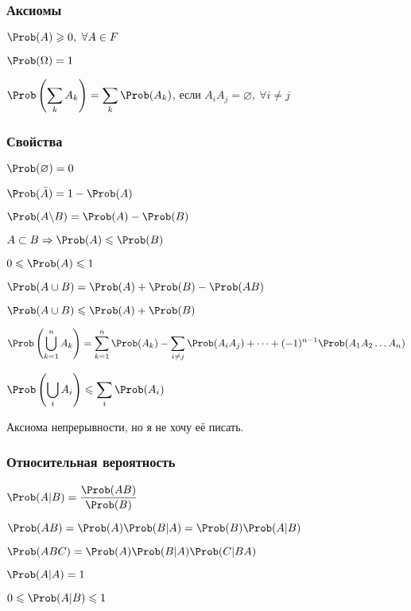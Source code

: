 \subsubsection{Аксиомы}

$\displaystyle \Prob(A) \geqslant 0,\ \forall A \in F $

$\displaystyle \Prob(\Omega) = 1 $

$\displaystyle \Prob\left(\sum_k A_k\right) = \sum_k \Prob(A_k) $, если $\displaystyle A_i A_j = \varnothing,\ \forall i \neq j $

\subsubsection{Свойства}

$\displaystyle \Prob(\varnothing) = 0 $

$\displaystyle \Prob(\bar{A}) = 1 - \Prob(A) $

$\displaystyle \Prob(A\backslash B) = \Prob(A) - \Prob(B) $

$\displaystyle A \subset B \Rightarrow \Prob(A) \leqslant \Prob(B) $

$\displaystyle 0 \leqslant \Prob(A) \leqslant 1 $

$\displaystyle \Prob(A\cup B) = \Prob(A) + \Prob(B) - \Prob(AB) $

$\displaystyle \Prob(A\cup B) \leqslant \Prob(A) + \Prob(B) $

$\displaystyle \Prob\left(\bigcup_{k=1}^{n} A_k\right) = \sum_{k=1}^{n}\Prob(A_k) - \sum_{i\neq j} \Prob(A_i A_j) + \dots + (-1)^{n-1} \Prob(A_1 A_2 \dots A_n) $

$\displaystyle \Prob\left(\bigcup_i A_i\right) \leqslant \sum_i \Prob(A_i) $

\*Аксиома непрерывности, но я не хочу её писать.\*

\subsubsection{Относительная вероятность}

$\displaystyle \Prob(A|B) = \frac{\Prob(AB)}{\Prob(B)} $

$\displaystyle \Prob(AB) = \Prob(A) \Prob(B|A) = \Prob(B) \Prob(A|B) $

$\displaystyle \Prob(ABC) = \Prob(A) \Prob(B|A) \Prob(C|BA) $

$\displaystyle \Prob(A|A) = 1 $

$\displaystyle 0 \leqslant \Prob(A|B) \leqslant 1 $

